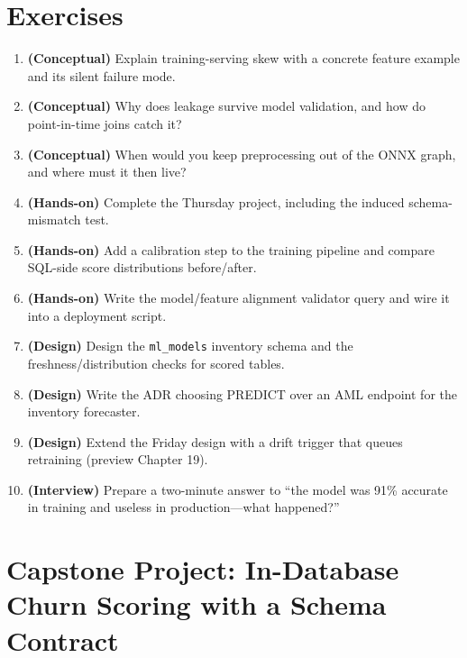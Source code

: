 \section{Exercises}
\begin{enumerate}
    \item \textbf{(Conceptual)} Explain training-serving skew with a concrete feature example and its silent failure mode.
    \item \textbf{(Conceptual)} Why does leakage survive model validation, and how do point-in-time joins catch it?
    \item \textbf{(Conceptual)} When would you keep preprocessing out of the ONNX graph, and where must it then live?
    \item \textbf{(Hands-on)} Complete the Thursday project, including the induced schema-mismatch test.
    \item \textbf{(Hands-on)} Add a calibration step to the training pipeline and compare SQL-side score distributions before/after.
    \item \textbf{(Hands-on)} Write the model/feature alignment validator query and wire it into a deployment script.
    \item \textbf{(Design)} Design the \texttt{ml\_models} inventory schema and the freshness/distribution checks for scored tables.
    \item \textbf{(Design)} Write the ADR choosing PREDICT over an AML endpoint for the inventory forecaster.
    \item \textbf{(Design)} Extend the Friday design with a drift trigger that queues retraining (preview Chapter 19).
    \item \textbf{(Interview)} Prepare a two-minute answer to ``the model was 91\% accurate in training and useless in production---what happened?''
\end{enumerate}

\section{Capstone Project: In-Database Churn Scoring with a Schema Contract}\label{sec:ch17-capstone}

